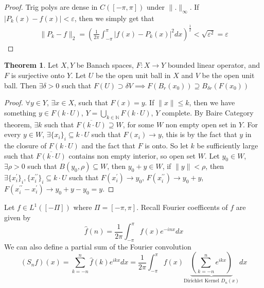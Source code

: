 \documentclass[13pt]{article}
\theoremstyle{definition} --- default
\newtheorem{theorem}{Theorem}
\theoremstyle{definition}
\theoremstyle{remark}
\begin{document}
\begin{proof}
    Trig polys are dense in $C([-\pi,\pi])$ under $\|.\|_\infty$. If $|P_k(x) - f(x)| < \varepsilon$, then we simply get that 
    \begin{align*}
        \|P_k - f\|_2 = (\frac{1}{2\pi} \int_{-\pi}^\pi |f(x) - P_k(x)|^2dx)^\frac{1}{2} < \sqrt{\varepsilon^2} = \varepsilon
    \end{align*}

\end{proof}

\begin{theorem}
	Let $X,Y$ be Banach spaces, $F \colon X \to Y$ bounded linear operator, and $F$ is surjective onto $Y$. Let $U$ be the open unit ball in $X$ and $V$ be the open unit ball. Then $\exists \delta > 0$ such that $F(U) \supset \delta V \implies F(B_r(x_0)) \supseteq B_{\delta r} (F(x_0))$
\end{theorem}
\begin{proof}
	$\forall y \in Y$, $\exists x \in X$, such that $F(x) = y$. If $\|x\| \leq k$, then we have something $y \in F(k\cdot U)$, $Y = \bigcup_{k \in \mathbb{N}} F(k \cdot U)$, $Y$ complete. By Baire Category theorem, $\exists k$ such that $\overline{F(k\cdot U)} \supseteq W$, for some $W$ non empty open set in $Y$. For every $y \in W$, $\exists \{x_i\}_i \subseteq k \cdot U$ such that $F(x_i) \to y$, this is by the fact that $y$ in the closure of $F(k\cdot U)$ and the fact that $F$ is onto. So let $k$ be sufficiently large such that $\overline{F(k \cdot U)}$ contains non empty interior, so open set $W$. Let $y_0 \in W$, $\exists \rho >0$ such that $B(y_0, \rho) \subseteq W$, then $y_0 + y \in W$, if $\|y\| < \rho$, then $\exists \{x_i^\prime\}_i, \{x^{\prime\prime}_i\}_i \subseteq k \cdot U$ such that $F(x_i^\prime) \to y_0$, $F(x_i^{\prime\prime}) \to y_0 + y$, $F(x_i^{\prime\prime}- x_i^\prime) \to y_0 + y - y_0 = y$.  
\end{proof}

Let $f \in L^1([-\Pi])$ where $\Pi = [-\pi,\pi]$. Recall Fourier coefficents of $f$ are given by 
$$
    \hat{f}(n) = \frac{1}{2\pi} \int_{-\pi}^\pi f(x)e^{-inx}dx
$$
We can also define a partial sum of the Fourier convolution
$$
    (S_n f)(x) = \sum_{k=-n}^n \hat{f}(k) e^{ikx}dx = \frac{1}{2\pi} \int_{-\pi}^\pi f(x) \underbrace{\left(\sum_{k=-n}^n e^{ikx}\right)}_{\text{Dirichlet Kernel $D_n(x)$}} dx 
$$
\end{document}

